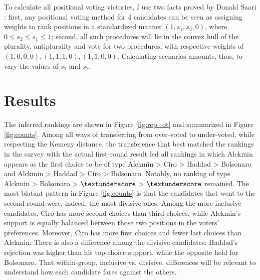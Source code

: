 \documentclass[hidelinks,11pt]{article}
\begin{document}
To calculate all positional voting victories, I use two facts proved by Donald
Saari \parencite{saari1995basic, saari2001chaotic}: first, any positional voting
method for 4 candidates can be seen as assigning weights to rank positions in a
standardized manner \((1,s_{1},s_{2},0)\), where
\(0 \leq s_{2} \leq s_{1} \leq 1\); second, all such procedures will lie in the
convex hull of the plurality, antiplurality and vote for two procedures, with
respective weights of \((1,0,0,0), (1,1,1,0), (1,1,0,0)\). Calculating scenarios
amounts, thus, to vary the values of \(s_{1}\) and \(s_{2}\).

\section{Results} The inferred rankings are shown in Figure \ref{fig:rep_ot} and
summarized in Figure \ref{fig:counts}. Among all ways of transferring from
over-voted to under-voted, while respecting the Kemeny distance, the
transference that best matched the rankings in the survey with the actual
first-round result led all rankings in which Alckmin appears as the first choice
to be of type Alckmin > Ciro > Haddad > Bolsonaro and Alckmin > Haddad > Ciro >
Bolsonaro. Notably, no ranking of type Alckmin > Bolsonaro > \(\textunderscore\)
> \(\textunderscore\) remained. The most blatant pattern in Figure
\ref{fig:counts} is that the candidates that went to the second round were,
indeed, the most divisive ones. Among the more inclusive candidates, Ciro has
more second choices than third choices, while Alckmin's support is equally
balanced between those two positions in the voters' preferences. Moreover, Ciro
has more first choices and fewer last choices than Alckmin. There is also a
difference among the divisive candidates: Haddad's rejection was higher than his
top-choice support, while the opposite held for Bolsonaro. That within-group,
inclusive vs. divisive, differences will be relevant to understand how each
candidate fares against the others.
\end{document}
